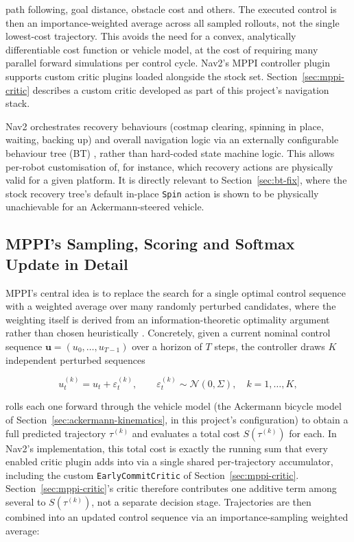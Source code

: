 \begin{description}
    path following, goal distance, obstacle cost and others. The
    executed control is then an importance-weighted average across
    all sampled rollouts, not the single lowest-cost trajectory.
    This avoids the need for a convex, analytically differentiable
    cost function or vehicle model, at the cost of requiring many
    parallel forward simulations per control cycle. Nav2's MPPI
    controller plugin supports custom critic plugins loaded
    alongside the stock set. Section~\ref{sec:mppi-critic} describes
    a custom critic developed as part of this project's navigation
    stack.
  \item[Behavior Trees] Nav2 orchestrates recovery behaviours (costmap
    clearing, spinning in place, waiting, backing up) and overall
    navigation logic via an externally configurable behaviour tree
    (BT) \cite{colledanchise2018bt}, rather than hard-coded state
    machine logic. This allows per-robot customisation of, for
    instance, which recovery actions are physically valid for a given
    platform. It is directly relevant to Section~\ref{sec:bt-fix},
    where the stock recovery tree's default in-place \texttt{Spin}
    action is shown to be physically unachievable for an
    Ackermann-steered vehicle.
\end{description}

\subsection{MPPI's Sampling, Scoring and Softmax Update in Detail}
\label{sec:mppi-math}

MPPI's central idea is to replace the search for a single optimal
control sequence with a weighted average over many randomly
perturbed candidates, where the weighting itself is derived from an
information-theoretic optimality argument rather than chosen
heuristically \cite{williams2015mppi}. Concretely,
given a current nominal control sequence
$\mathbf{u} = (u_0, \ldots, u_{T-1})$ over a horizon of $T$ steps,
the controller draws $K$ independent perturbed sequences

\begin{equation}
  u_t^{(k)} = u_t + \varepsilon_t^{(k)}, \qquad \varepsilon_t^{(k)} \sim \mathcal{N}(0, \Sigma), \quad k = 1, \ldots, K,
  \label{eq:mppi-sample}
\end{equation}

rolls each one forward through the vehicle model (the Ackermann
bicycle model of Section~\ref{sec:ackermann-kinematics}, in this
project's configuration) to obtain a full predicted trajectory
$\tau^{(k)}$ and evaluates a total cost $S(\tau^{(k)})$ for each. In
Nav2's implementation, this total cost is exactly the running sum
that every enabled critic plugin adds into via a single shared
per-trajectory accumulator, including the custom
\texttt{EarlyCommitCritic} of Section~\ref{sec:mppi-critic}.
Section~\ref{sec:mppi-critic}'s critic therefore contributes one
additive term among several to $S(\tau^{(k)})$, not a separate
decision stage. Trajectories are then combined into an updated
control sequence via an importance-sampling weighted average:

